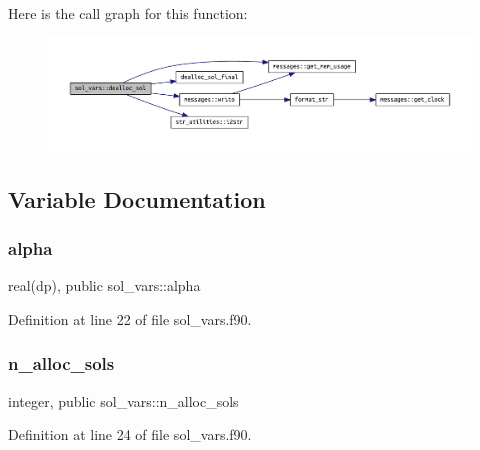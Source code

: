 Here is the call graph for this function\+:
\nopagebreak
\begin{figure}[H]
\begin{center}
\leavevmode
\includegraphics[width=350pt]{namespacesol__vars_a9ae65a5252aede548e5238e50c1bb2ba_cgraph}
\end{center}
\end{figure}


\subsection{Variable Documentation}
\mbox{\label{namespacesol__vars_adbe33095cf2396e4a5c9108d7d1dcf11}} 
\subsubsection{\texorpdfstring{alpha}{alpha}}
{\footnotesize\ttfamily real(dp), public sol\+\_\+vars\+::alpha}



Definition at line 22 of file sol\+\_\+vars.\+f90.

\mbox{\label{namespacesol__vars_a91634d69ba45b896816f40e9013ddc79}} 
\subsubsection{\texorpdfstring{n\+\_\+alloc\+\_\+sols}{n\_alloc\_sols}}
{\footnotesize\ttfamily integer, public sol\+\_\+vars\+::n\+\_\+alloc\+\_\+sols}



Definition at line 24 of file sol\+\_\+vars.\+f90.

